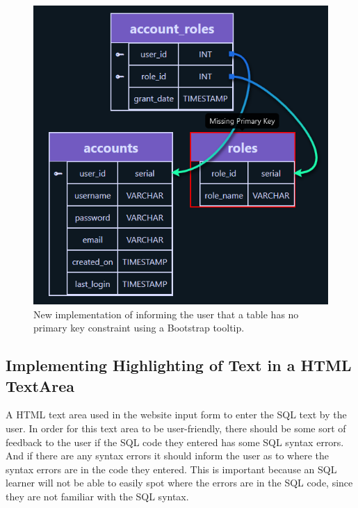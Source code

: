 \begin{figure}[h!]
	\centering
	\includegraphics[scale = 0.8]{missingFKNew}
	\caption{New implementation of informing the user that a table has no primary key constraint using a Bootstrap tooltip.}
	\label{fig:missingFKNew}
\end{figure}

\subsection{Implementing Highlighting of Text in a HTML TextArea}

A HTML text area used in the website input form to enter the SQL text by the user. In order for this text area to be user-friendly, there should be some sort of feedback to the user if the SQL code they entered has some SQL syntax errors. And if there are any syntax errors it should inform the user as to where the syntax errors are in the code they entered. This is important because an SQL learner will not be able to easily spot where the errors are in the SQL code, since they are not familiar with the SQL syntax. 

